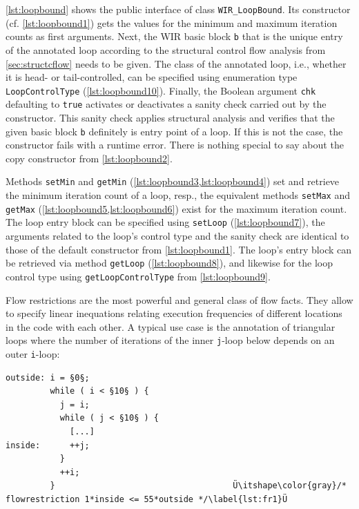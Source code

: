 \cref{lst:loopbound} shows the public interface of class \texttt{WIR\_LoopBound}.
Its constructor (cf. \cref{lst:loopbound1}) gets the values for the minimum and maximum iteration counts as first arguments.
Next, the \gls{WIR} basic block \texttt{b} that is the unique entry of the annotated loop according to the structural control flow analysis from \cref{sec:structcflow} needs to be given.
The class of the annotated loop, i.e., whether it is head- or tail-controlled, can be specified using enumeration type \texttt{LoopControlType} (\cref{lst:loopbound10}).
Finally, the Boolean argument \texttt{chk} defaulting to \texttt{true} activates or deactivates a sanity check carried out by the constructor.
This sanity check applies structural analysis and verifies that the given basic block \texttt{b} definitely is entry point of a loop.
If this is not the case, the constructor fails with a runtime error.
There is nothing special to say about the copy constructor from \cref{lst:loopbound2}.

Methods \texttt{setMin} and \texttt{getMin} (\cref{lst:loopbound3,lst:loopbound4}) set and retrieve the minimum iteration count of a loop, resp., the equivalent methods \texttt{setMax} and \texttt{getMax} (\cref{lst:loopbound5,lst:loopbound6}) exist for the maximum iteration count.
The loop entry block can be specified using \texttt{setLoop} (\cref{lst:loopbound7}), the arguments related to the loop's control type and the sanity check are identical to those of the default constructor from \cref{lst:loopbound1}.
The loop's entry block can be retrieved via method \texttt{getLoop} (\cref{lst:loopbound8}), and likewise for the loop control type using \texttt{getLoopControlType} from \cref{lst:loopbound9}.

Flow restrictions are the most powerful and general class of flow facts.
They allow to specify linear inequations relating execution frequencies of different locations in the code with each other.
A typical use case is the annotation of triangular loops where the number of iterations of the inner \texttt{j}-loop below depends on an outer \texttt{i}-loop:

\begin{lstlisting}[style=code,float=!h]
outside: i = §0§;
         while ( i < §10§ ) {
           j = i;
           while ( j < §10§ ) {
             [...]
inside:      ++j;
           }
           ++i;
         }                                    Ü\itshape\color{gray}/* flowrestriction 1*inside <= 55*outside */\label{lst:fr1}Ü
\end{lstlisting}

